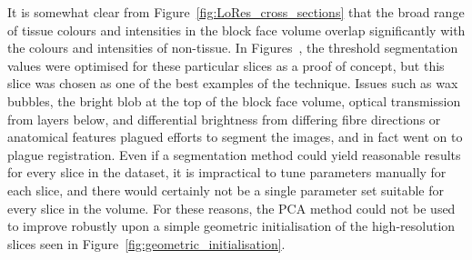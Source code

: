 	    It is somewhat clear from Figure~\ref{fig:LoRes_cross_sections} that the broad range of tissue colours and intensities in the block face volume overlap significantly with the colours and intensities of non-tissue. In Figures~, the threshold segmentation values were optimised for these particular slices as a proof of concept, but this slice was chosen as one of the best examples of the technique. Issues such as wax bubbles, the bright blob at the top of the block face volume, optical transmission from layers below, and differential brightness from differing fibre directions or anatomical features plagued efforts to segment the images, and in fact went on to plague registration. Even if a segmentation method could yield reasonable results for every slice in the dataset, it is impractical to tune parameters manually for each slice, and there would certainly not be a single parameter set suitable for every slice in the volume. For these reasons, the PCA method could not be used to improve robustly upon a simple geometric initialisation of the high-resolution slices seen in Figure~\ref{fig:geometric_initialisation}.
    
